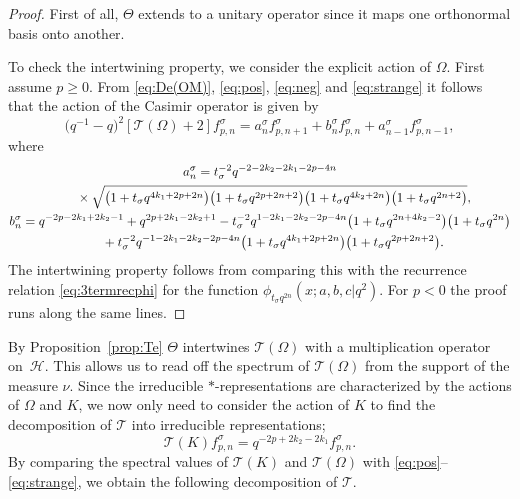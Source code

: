 \documentclass[11pt]{article}
\numberwithin{equation}{section}
\numberwithin{theorem}{section}
\numberwithin{proposition}{section}
\numberwithin{lemma}{section}
\numberwithin{corollary}{section}
\numberwithin{definition}{section}
\numberwithin{example}{section}
\numberwithin{remark}{section}
\numberwithin{note}{section}
\begin{document}
\begin{proof}
First of all, $\Theta$ extends to a unitary operator since it maps one orthonormal basis onto another.

To check the intertwining property, we consider the explicit action of $\Omega$.
First assume $p \geq 0$. From \eqref{eq:De(OM)}, \eqref{eq:pos}, \eqref{eq:neg} and \eqref{eq:strange} it follows that the action of the Casimir operator is given by
\[
\big(q^{-1}-q\big)^2 [\mathcal T(\Omega)+2 ] f_{p,n}^\sigma = a_n^\sigma f_{p,n+1}^\sigma + b_n^\sigma f_{p,n}^\sigma + a_{n-1}^\sigma f_{p,n-1}^\sigma,
\]
where
\begin{gather*}
a_n^\sigma =   t_\sigma^{-2}q^{-2-2k_2-2k_1-2p-4n}\\
 \hphantom{a_n^\sigma =}{}
 \times \sqrt{ \big(1+t_\sigma q^{4k_1+2p+2n}\big)\big(1+t_\sigma q^{2p+2n+2}\big)\big(1+t_\sigma q^{4k_2+2n}\big) \big(1+t_\sigma q^{2n+2}\big)},\\
b_n^\sigma=   q^{-2p-2k_1+2k_2-1} +q^{2p+2k_1-2k_2+1} - t_\sigma^{-2}q^{1-2k_1-2k_2-2p-4n}\big(1+t_\sigma q^{2n+4k_2-2}\big)\big(1+t_\sigma q^{2n}\big) \\
\phantom{b_n^\sigma=}{}
 + t_\sigma^{-2}q^{-1-2k_1-2k_2-2p-4n}\big(1+t_\sigma q^{4k_1+2p+2n}\big)\big(1+t_\sigma q^{2p+2n+2}\big).
\end{gather*}
The intertwining property follows from comparing this with the recurrence relation \eqref{eq:3termrecphi} for the function $\phi_{t_\sigma q^{2n}}(x;a,b,c|q^2)$. For $p <0$ the proof runs along the same lines.
\end{proof}

By Proposition~\ref{prop:Te} $\Theta$ intertwines $\mathcal T(\Omega)$ with a multiplication operator on~$\mathcal H$. This allows us to read of\/f the spectrum of $\mathcal T(\Omega)$ from the support of the measure $\nu$. Since the irreducible $*$-representations are characterized by the actions of $\Omega$ and $K$, we now only need to consider the action of $K$ to f\/ind the decomposition of $\mathcal T$ into irreducible representations;
\[
\mathcal T(K) f_{p,n}^\sigma = q^{-2p + 2k_2 -2k_1}  f_{p,n}^\sigma.
\]
By comparing the spectral values of $\mathcal T(K)$ and $\mathcal T(\Omega)$ with \eqref{eq:pos}--\eqref{eq:strange}, we obtain the following decomposition of $\mathcal T$.
\end{document}
